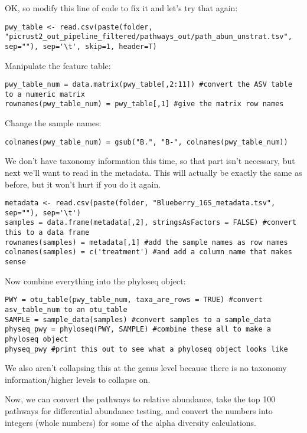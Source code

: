 \documentclass[
]{book}
\begin{document}
OK, so modify this line of code to fix it and let's try that again:

\begin{verbatim}
pwy_table <- read.csv(paste(folder, "picrust2_out_pipeline_filtered/pathways_out/path_abun_unstrat.tsv", sep=""), sep='\t', skip=1, header=T)
\end{verbatim}

Manipulate the feature table:

\begin{verbatim}
pwy_table_num = data.matrix(pwy_table[,2:11]) #convert the ASV table to a numeric matrix
rownames(pwy_table_num) = pwy_table[,1] #give the matrix row names
\end{verbatim}

Change the sample names:

\begin{verbatim}
colnames(pwy_table_num) = gsub("B.", "B-", colnames(pwy_table_num))
\end{verbatim}

We don't have taxonomy information this time, so that part isn't necessary, but next we'll want to read in the metadata. This will actually be exactly the same as before, but it won't hurt if you do it again.

\begin{verbatim}
metadata <- read.csv(paste(folder, "Blueberry_16S_metadata.tsv", sep=""), sep='\t')
samples = data.frame(metadata[,2], stringsAsFactors = FALSE) #convert this to a data frame
rownames(samples) = metadata[,1] #add the sample names as row names
colnames(samples) = c('treatment') #and add a column name that makes sense
\end{verbatim}

Now combine everything into the phyloseq object:

\begin{verbatim}
PWY = otu_table(pwy_table_num, taxa_are_rows = TRUE) #convert asv_table_num to an otu_table
SAMPLE = sample_data(samples) #convert samples to a sample_data
physeq_pwy = phyloseq(PWY, SAMPLE) #combine these all to make a phyloseq object
physeq_pwy #print this out to see what a phyloseq object looks like
\end{verbatim}

We also aren't collapsing this at the genus level because there is no taxonomy information/higher levels to collapse on.

Now, we can convert the pathways to relative abundance, take the top 100 pathways for differential abundance testing, and convert the numbers into integers (whole numbers) for some of the alpha diversity calculations.
\end{document}
